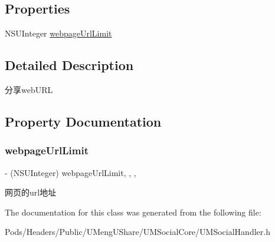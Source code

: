 \subsection*{Properties}
\begin{DoxyCompactItemize}
\item 
N\+S\+U\+Integer \mbox{\hyperlink{interface_u_m_social_share_webpage_object_config_a791db1b5e0592dd8a90846a6038e2e52}{webpage\+Url\+Limit}}
\end{DoxyCompactItemize}


\subsection{Detailed Description}
分享web\+U\+RL 

\subsection{Property Documentation}
\mbox{\label{interface_u_m_social_share_webpage_object_config_a791db1b5e0592dd8a90846a6038e2e52}} 
\subsubsection{\texorpdfstring{webpage\+Url\+Limit}{webpageUrlLimit}}
{\footnotesize\ttfamily -\/ (N\+S\+U\+Integer) webpage\+Url\+Limit\hspace{0.3cm}{\ttfamily [read]}, {\ttfamily [write]}, {\ttfamily [nonatomic]}, {\ttfamily [assign]}}

网页的url地址 

The documentation for this class was generated from the following file\+:\begin{DoxyCompactItemize}
\item 
Pods/\+Headers/\+Public/\+U\+Meng\+U\+Share/\+U\+M\+Social\+Core/U\+M\+Social\+Handler.\+h\end{DoxyCompactItemize}
